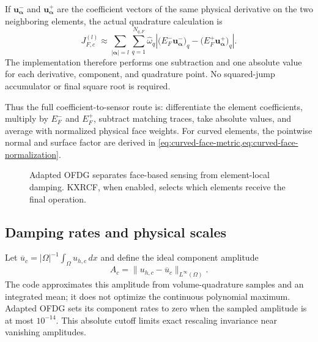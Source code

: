 If $\boldsymbol{u}_{\boldsymbol{\alpha}}^-$ and
$\boldsymbol{u}_{\boldsymbol{\alpha}}^+$ are the coefficient vectors of the
same physical derivative on the two neighboring elements, the actual quadrature
calculation is
\begin{equation}
  J_{F,c}^{(l)}
  \approx\sum_{|\boldsymbol{\alpha}|=l}\sum_{q=1}^{N_{q,F}}
  \widehat{\omega}_q
  \left|
    \bigl(E_F^-\boldsymbol{u}_{\boldsymbol{\alpha}}^-\bigr)_q
    -\bigl(E_F^+\boldsymbol{u}_{\boldsymbol{\alpha}}^+\bigr)_q
  \right|.
  \label{eq:ofdg-discrete-face-jump}
\end{equation}
The implementation therefore performs one subtraction and one absolute value for
each derivative, component, and quadrature point.  No squared-jump accumulator or
final square root is required.

Thus the full coefficient-to-sensor route is: differentiate the element
coefficients, multiply by $E_F^-$ and $E_F^+$, subtract matching traces,
take absolute values, and average with normalized physical face weights.
For curved elements, the pointwise normal and surface factor are derived in
\cref{eq:curved-face-metric,eq:curved-face-normalization}.

\begin{figure}[htbp]
\centering
{}
\caption{Adapted OFDG separates face-based sensing from element-local damping.
KXRCF, when enabled, selects which elements receive the final operation.}
\label{fig:ofdg-pipeline}
\end{figure}

\subsection{Damping rates and physical scales}
\label{sec:ofdg-rates}
Let $\overline u_c=|\Omega|^{-1}\int_\Omega u_{h,c}\,dx$ and define the ideal
component amplitude
\begin{equation}
 A_c=\|u_{h,c}-\overline u_c\|_{L^\infty(\Omega)}.
 \label{eq:ofdg-global-scale}
\end{equation}
The code approximates this amplitude from volume-quadrature samples and an
integrated mean; it does not optimize the continuous polynomial maximum.
Adapted OFDG sets its component rates to zero when the sampled amplitude is
at most $10^{-14}$. This absolute cutoff limits exact rescaling invariance
near vanishing amplitudes.

